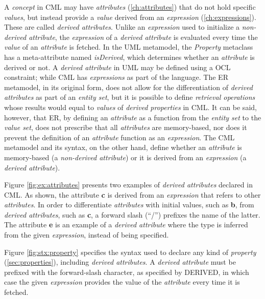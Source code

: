 \begin{definition}
A \emph{concept} in CML may have \emph{attributes} (\ref{ch:attributes})
that do not hold specific \emph{values},
but instead provide a \emph{value} derived from an \emph{expression} (\ref{ch:expressions}).
These are called \emph{derived attributes}.
Unlike an \emph{expression} used to initialize a \emph{non-derived attribute},
the \emph{expression} of a \emph{derived attribute} is evaluated
every time the \emph{value} of an \emph{attribute} is fetched.
In the UML \cite{uml} metamodel,
the \emph{Property} metaclass has a meta-attribute named \emph{isDerived},
which determines whether an \emph{attribute} is derived or not.
A \emph{derived attribute} in UML may be defined using a OCL \cite{ocl} constraint;
while CML has \emph{expressions} as part of the language.
The ER \cite{er} metamodel,
in its original form,
does not allow for the differentiation of \emph{derived attributes}
as part of an \emph{entity set},
but it is possible to define \emph{retrieval operations} whose 
results would equal to \emph{values} of \emph{derived properties} in CML.
It can be said, however, that ER,
by defining an \emph{attribute} as a function from the \emph{entity set}
to the \emph{value set},
does not prescribe that all \emph{attributes} are memory-based,
nor does it prevent the definition of an \emph{attribute} function 
as an \emph{expression}.
The CML metamodel and its syntax, on the other hand,
define whether an \emph{attribute} is memory-based (a \emph{non-derived attribute})
or it is derived from an \emph{expression} (a \emph{derived attribute}).
\end{definition}

\begin{examples}
Figure \ref{fig:ex:attributes} presents two examples of \emph{derived attributes}
declared in CML.
As shown,
the attribute \textbf{c} is derived from an \emph{expression}
that refers to other \emph{attributes}.
In order to differentiate \emph{attributes} with initial values,
such as \textbf{b},
from \emph{derived attributes},
such as \textbf{c},
a forward slash (``/'') prefixes the name of the latter.
The attribute \textbf{e} is an example of a \emph{derived attribute}
where the type is inferred from the given \emph{expression},
instead of being specified.
\end{examples}

\begin{concrete-syntax}
Figure \ref{fig:stx:property} specifies the syntax used
to declare any kind of \emph{property} (\ref{sec:properties}),
including \emph{derived attributes}.
A \emph{derived attribute} must be prefixed with the forward-slash character,
as specified by DERIVED,
in which case the given \emph{expression} provides the value
of the \emph{attribute} every time it is fetched.
\end{concrete-syntax}

